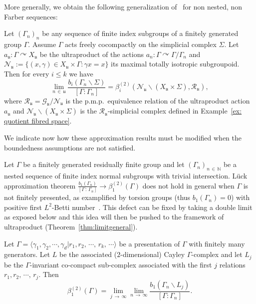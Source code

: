 \documentclass[AHL,Unicode,longabstracts,published]{cedram}
\newcommand{\Nmath}{\mathbb{N}}
\newcommand{\acting}{\curvearrowright}
\newcommand{\RR}{\mathcal{R}}
\newcommand{\cn}{\mathcal{N}}
\newcommand{\cg}{\mathcal{G}}
\newcommand{\ul}{\mathfrak{u}}
\newcommand{\pmp}{p.m.p.\ }
\begin{document}
More generally, we obtain the following generalization of~\cite[Theorem~3.1]{berggab} for non nested, non Farber sequences:
\begin{coro}
Let $(\Gamma_n)_n$ be any sequence of finite index subgroups of a finitely generated group $\Gamma$. Assume $\Gamma$ acts freely cocompactly on the simplicial complex $\Sigma$. Let $a_{\ul}:\Gamma\acting X_{\ul}$ be the ultraproduct of the actions $a_n:\Gamma\acting \Gamma/\Gamma_n$ and $\cn_\ul:=\{(x,\gamma)\in X_{\ul}\times \Gamma: \gamma x=x\} $ its maximal totally isotropic subgroupoid. Then for every $i\leq k$ we have
\[
\lim\limits_{n\,\in\,\ul}\frac{b_i(\Gamma_n\backslash \Sigma)}{[\Gamma:\Gamma_n]}=\beta^{(2)}_i(\cn_\ul \backslash \left(X_{\ul}\times \Sigma\right),\RR_\ul),
\]
where $\RR_\ul=\cg_\ul/\cn_\ul$ is the \pmp equivalence relation of the ultraproduct action $a_\ul$ and $\cn_\ul \backslash \left(X_{\ul}\times \Sigma\right)$ is the $\RR_{\ul}$-simplicial complex defined in Example~\ref{ex: quotient fibred space}.
\end{coro}


We indicate now how these approximation results must be modified when the boundedness assumptions are not satisfied.

Let $\Gamma$ be a finitely generated residually finite group and let $(\Gamma_n)_{n\,\in\,\Nmath}$ be a nested sequence of finite index normal subgroups with trivial intersection. Lück approximation theorem $\frac{b_1(\Gamma_n)}{[\Gamma\,:\,\Gamma_n]} \to \beta_1^{(2)}(\Gamma)$ does not hold in general when $\Gamma$ is not finitely presented, as examplified by torsion groups (thus $b_1(\Gamma_n)=0$) with positive first $L^2$-Betti number~\cite{Lueck-Osin-2011}. This defect can be fixed by taking a double limit as exposed below and this idea will then be pushed to the framework of ultraproduct (Theorem~\ref{thm:limitgeneral}).
\begin{prop}
Let $\Gamma=\langle \gamma_1, \gamma_2, \cdots, \gamma_d\vert r_1, r_2,\,\cdots,\,r_k,\,\cdots\rangle$ be a presentation of $\Gamma$ with finitely many generators. Let $L$ be the associated ($2$-dimensional) Cayley $\Gamma$-complex and let $L_j$ be the $\Gamma$-invariant co-compact sub-complex associated with the first $j$ relations $ r_1, r_2,\,\cdots,\,r_j$. Then
\[
\beta_1^{(2)}(\Gamma)=
\lim\limits_{j\,\to\,\infty}
\lim\limits_{n\,\to\,\infty}
\frac{b_1(\Gamma_n\backslash L_j)}{[\Gamma:\Gamma_n]}.
\]
\end{prop}
\end{document}
